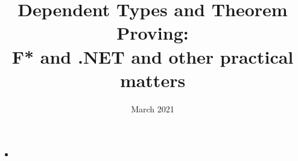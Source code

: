 \documentclass{beamer}
\title{Dependent Types and Theorem Proving: \\F* and .NET and other practical matters}
\author{}
\date{March 2021}
\begin{document}
\frame{\titlepage}
\frame{\tableofcontents}


\begin{frame}{}
\begin{itemize}
	\item 
\end{itemize}
\end{frame}
\end{document}
